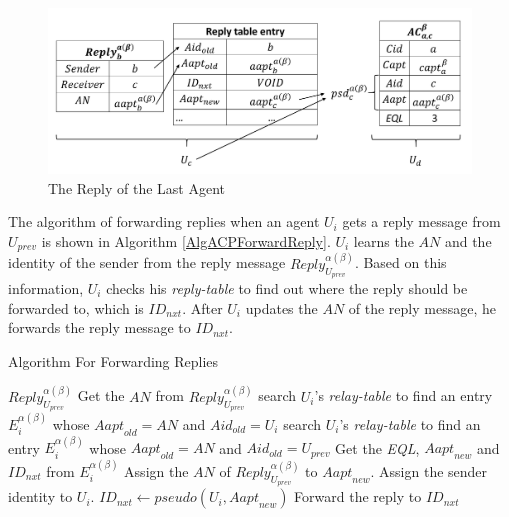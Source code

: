 \begin{figure} [hbtp]
\centering 
\includegraphics[width=6.0in]{figures/FIG_4_9_The_Reply_of_the_Last_Agent.png}
\caption{The Reply of the Last Agent} 
\label{fig:ReplyOfLastAgent} %
\end{figure}

The algorithm of forwarding replies when an agent $U_i$ gets a reply message from $U_{prev}$ is shown in Algorithm \ref{AlgACPForwardReply}. $U_i$ learns the $AN$ and the identity of the sender from the reply message ${Reply}_{U_{prev}}^{\alpha\left(\beta\right)}$. Based on this information, $U_i$ checks his \textit{reply-table} to find out where the reply should be forwarded to, which is ${ID}_{nxt}$. After $U_i$ updates the $AN$ of the reply message, he forwards the reply message to ${ID}_{nxt}$.

\begin{algorithm} [hbtp]
\caption{Algorithm For Forwarding Replies}\label{AlgACPForwardReply}
\begin{algorithmic}[1]
 {${Reply}_{U_{prev}}^{\alpha\left(\beta\right)}$}
\State Get the $AN$ from ${Reply}_{U_{prev}}^{\alpha\left(\beta\right)}$
\State search $U_i$’s \textit{relay-table} to find an entry $E_i^{\alpha\left(\beta\right)}$
\State whose ${Aapt}_{old}=AN$ and ${Aid}_{old}=U_i$
\Else
\State search $U_i$’s \textit{relay-table} to find an entry $E_i^{\alpha\left(\beta\right)}$
\State whose ${Aapt}_{old}=AN$ and ${Aid}_{old}=U_{prev}$ 
\EndIf
\State Get the \textit{EQL}, ${Aapt}_{new}$ and ${ID}_{nxt}$ from $E_i^{\alpha\left(\beta\right)}$
\State Assign the $AN$ of ${Reply}_{U_{prev}}^{\alpha\left(\beta\right)}$ to ${Aapt}_{new}$.
\State Assign the sender identity to $U_i$.
\State ${ID}_{nxt}\gets pseudo\left(U_i,{Aapt}_{new}\right)$
\EndIf
\State Forward the reply to ${ID}_{nxt}$
\EndProcedure

\end{algorithmic}
\end{algorithm}

